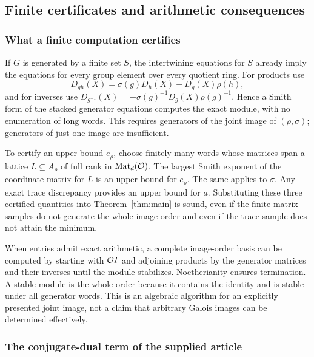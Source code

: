 \subsection{Finite certificates and arithmetic consequences}

\subsubsection{What a finite computation certifies}

If $G$ is generated by a finite set $S$, the intertwining equations for
$S$ already imply the equations for every group element over every
quotient ring. For products use
\[
 D_{gh}(X)=\sigma(g)D_h(X)+D_g(X)\rho(h),
\]
and for inverses use
$D_{g^{-1}}(X)=-\sigma(g)^{-1}D_g(X)\rho(g)^{-1}$.
Hence a Smith form of the stacked generator equations computes the exact
module, with no enumeration of long words. This requires generators of
the joint image of $(\rho,\sigma)$; generators of just one image are
insufficient.

To certify an upper bound $e_\rho$, choose finitely many words whose
matrices span a lattice $L\subseteq A_\rho$ of full rank in
$\operatorname{Mat}_d(\mathcal O)$. The largest Smith exponent of the coordinate matrix for
$L$ is an upper bound for $e_\rho$. The same applies to $\sigma$.
Any exact trace discrepancy provides an upper bound for $a$. Substituting
these three certified quantities into Theorem~\ref{thm:main} is sound,
even if the finite matrix samples do not generate the whole image order
and even if the trace sample does not attain the minimum.

When entries admit exact arithmetic, a complete image-order basis can be
computed by starting with $\mathcal O I$ and adjoining products by the generator
matrices and their inverses until the module stabilizes. Noetherianity
ensures termination. A stable module is the whole order because it
contains the identity and is stable under all generator words. This is
an algebraic algorithm for an explicitly presented joint image, not a
claim that arbitrary Galois images can be determined effectively.

\subsubsection{The conjugate-dual term of the supplied article}

